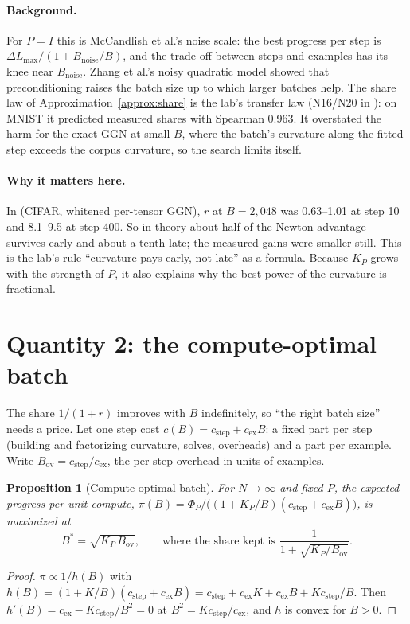 \documentclass[11pt,a4paper]{article}
\newcommand{\Bov}{B_{\mathrm{ov}}}
\newcommand{\study}[1]{\path{#1}}
\theoremstyle{plain}
\newtheorem{proposition}{Proposition}
\theoremstyle{definition}
\theoremstyle{remark}
\begin{document}
\paragraph{Background.} For $P=I$ this is McCandlish et al.'s noise scale: the best progress per step is
$\Delta L_{\max}/(1+B_{\mathrm{noise}}/B)$, and the trade-off between steps and examples has its knee near
$B_{\mathrm{noise}}$. Zhang et al.'s noisy quadratic model showed that preconditioning raises the batch size up to
which larger batches help. The share law of Approximation~\ref{approx:share} is the lab's transfer law (N16/N20 in
): on MNIST it predicted measured shares with Spearman 0.963. It overstated the harm for
the exact GGN at small $B$, where the batch's curvature along the fitted step exceeds the corpus curvature, so the
search limits itself.

\paragraph{Why it matters here.} In \study{noise_scale_20261021} (CIFAR, whitened per-tensor GGN), $r$ at
$B=2{,}048$ was 0.63--1.01 at step 10 and 8.1--9.5 at step 400. So in theory about half of the Newton advantage
survives early and about a tenth late; the measured gains were smaller still. This is the lab's rule ``curvature pays
early, not late'' as a formula. Because $K_P$ grows with the strength of $P$, it also explains why the best power of
the curvature is fractional.

\section{Quantity 2: the compute-optimal batch}\label{sec:cost}

The share $1/(1+r)$ improves with $B$ indefinitely, so ``the right batch size'' needs a price. Let one step cost
$c(B)=c_{\mathrm{step}}+c_{\mathrm{ex}}B$: a fixed part per step (building and factorizing curvature, solves,
overheads) and a part per example. Write $\Bov=c_{\mathrm{step}}/c_{\mathrm{ex}}$, the per-step overhead in units of
examples.

\begin{proposition}[Compute-optimal batch]\label{prop:cost}
For $N\to\infty$ and fixed $P$, the expected progress per unit compute,
$\pi(B)=\Phi_P/\bigl((1+K_P/B)(c_{\mathrm{step}}+c_{\mathrm{ex}}B)\bigr)$, is maximized at
\[
B^*=\sqrt{K_P\,\Bov},\qquad\text{where the share kept is }\frac{1}{1+\sqrt{K_P/\Bov}} .
\]
\end{proposition}
\begin{proof}
$\pi\propto 1/h(B)$ with $h(B)=(1+K/B)(c_{\mathrm{step}}+c_{\mathrm{ex}}B)
=c_{\mathrm{step}}+c_{\mathrm{ex}}K+c_{\mathrm{ex}}B+Kc_{\mathrm{step}}/B$. Then
$h'(B)=c_{\mathrm{ex}}-Kc_{\mathrm{step}}/B^2=0$ at $B^2=Kc_{\mathrm{step}}/c_{\mathrm{ex}}$, and $h$ is convex
for $B>0$.
\end{proof}
\end{document}
